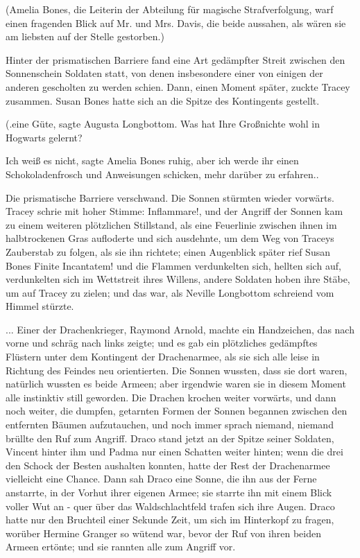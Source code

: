(Amelia Bones, die Leiterin der Abteilung für magische Strafverfolgung, warf
einen fragenden Blick auf Mr. und Mrs. Davis, die beide aussahen, als wären sie
am liebsten auf der Stelle gestorben.)

Hinter der prismatischen Barriere fand eine Art gedämpfter Streit zwischen den
Sonnenschein Soldaten statt, von denen insbesondere einer von einigen der
anderen gescholten zu werden schien. Dann, einen Moment später, zuckte Tracey
zusammen. Susan Bones hatte sich an die Spitze des Kontingents gestellt.

(\grqq{}.eine Güte\grqq{}, sagte Augusta Longbottom. \glqq{}Was hat Ihre
Großnichte wohl in Hogwarts gelernt?\grqq{}

\glqq{}Ich weiß es nicht\grqq{}, sagte Amelia Bones ruhig, \glqq{}aber ich werde
ihr einen Schokoladenfrosch und Anweisungen schicken, mehr darüber zu
erfahren.\grqq{}.

Die prismatische Barriere verschwand. Die Sonnen stürmten wieder vorwärts.
Tracey schrie mit hoher Stimme: \glqq{}Inflammare!\grqq{}, und der Angriff der
Sonnen kam zu einem weiteren plötzlichen Stillstand, als eine Feuerlinie
zwischen ihnen im halbtrockenen Gras aufloderte und sich ausdehnte, um dem Weg
von Traceys Zauberstab zu folgen, als sie ihn richtete; einen Augenblick später
rief Susan Bones \glqq{}Finite Incantatem!\grqq{} und die Flammen verdunkelten
sich, hellten sich auf, verdunkelten sich im Wettstreit ihres Willens, andere
Soldaten hoben ihre Stäbe, um auf Tracey zu zielen; und das war, als Neville
Longbottom schreiend vom Himmel stürzte.

... Einer der Drachenkrieger, Raymond Arnold, machte ein Handzeichen, das nach
vorne und schräg nach links zeigte; und es gab ein plötzliches gedämpftes
Flüstern unter dem Kontingent der Drachenarmee, als sie sich alle leise in
Richtung des Feindes neu orientierten. Die Sonnen wussten, dass sie dort waren,
natürlich wussten es beide Armeen; aber irgendwie waren sie in diesem Moment
alle instinktiv still geworden. Die Drachen krochen weiter vorwärts, und dann
noch weiter, die dumpfen, getarnten Formen der Sonnen begannen zwischen den
entfernten Bäumen aufzutauchen, und noch immer sprach niemand, niemand brüllte
den Ruf zum Angriff. Draco stand jetzt an der Spitze seiner Soldaten, Vincent
hinter ihm und Padma nur einen Schatten weiter hinten; wenn die drei den Schock
der Besten aushalten konnten, hatte der Rest der Drachenarmee vielleicht eine
Chance. Dann sah Draco eine Sonne, die ihn aus der Ferne anstarrte, in der
Vorhut ihrer eigenen Armee; sie starrte ihn mit einem Blick voller Wut an - quer
über das Waldschlachtfeld trafen sich ihre Augen. Draco hatte nur den Bruchteil
einer Sekunde Zeit, um sich im Hinterkopf zu fragen, worüber Hermine Granger so
wütend war, bevor der Ruf von ihren beiden Armeen ertönte; und sie rannten alle
zum Angriff vor.

